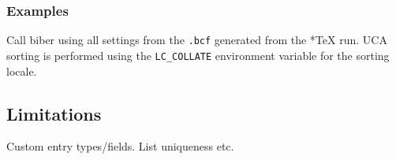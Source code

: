 \documentclass{ltxdockit}
\def\biberex#1{\hbox{\hspace{-4em}\texttt{\small \detokenize{#1}}}}
\begin{document}
\subsubsection{Examples}

\biberex{biber}

\noindent Call biber using all settings from the \verb=.bcf= generated from the
*TeX run. UCA sorting is performed using the \verb=LC_COLLATE= environment
variable for the sorting locale.



\subsection{Limitations}
\label{use:limit}

Custom entry types/fields. List uniqueness etc.
\end{document}
